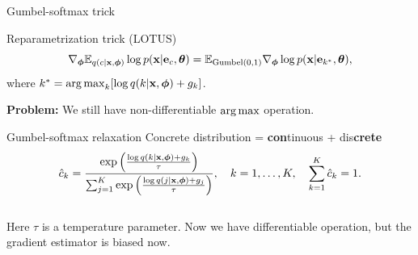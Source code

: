 \begin{frame}{Gumbel-softmax trick}
	\begin{block}{Reparametrization trick (LOTUS)}
		\vspace{-0.7cm}
		\[
			\nabla_{\boldsymbol{\phi}} \mathbb{E}_{q(c | \mathbf{x}, \boldsymbol{\phi})} \log p(\mathbf{x} | \mathbf{e}_{c} , \boldsymbol{\theta}) = \mathbb{E}_{\text{Gumbel}(0, 1)} \nabla_{\boldsymbol{\phi}} \log p(\mathbf{x} | \mathbf{e}_{k^*} , \boldsymbol{\theta}),
		\]
		where $k^* = \operatorname*{arg\,max}_k [\log q(k | \mathbf{x}, \boldsymbol{\phi}) + g_k]$.
	\end{block}
	\textbf{Problem:} We still have non-differentiable $\operatorname*{arg\,max}$ operation.
	
	\begin{block}{Gumbel-softmax relaxation}
		{\color{violet}Con}{\color{teal}crete} distribution = {\color{violet}\textbf{con}tinuous} + {\color{teal}dis\textbf{crete}}
		\vspace{-0.2cm}
		\[
			\hat{c}_k = \frac{\exp \left(\frac{\log q(k | \mathbf{x}, \boldsymbol{\phi}) + g_k}{\tau}\right)}{\sum_{j=1}^K \exp \left(\frac{\log q(j | \mathbf{x}, \boldsymbol{\phi}) + g_j}{\tau}\right)}, \quad k = 1, \dots, K, \quad \sum_{k=1}^K \hat{c}_k = 1.
		\]
		\vspace{-0.4cm} \\
		Here $\tau$ is a temperature parameter. Now we have differentiable operation, but the gradient estimator is biased now.
 	\end{block}
\end{frame}

